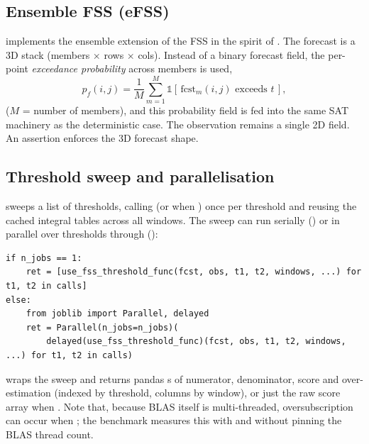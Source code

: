 \subsection{Ensemble FSS (eFSS)}
\label{sec:eps}

 implements the ensemble extension of the FSS in the
spirit of \citet{duc2013}. The forecast is a 3D stack (members $\times$ rows
$\times$ cols). Instead of a binary forecast field, the per-point
\emph{exceedance probability} across members is used,
%
\begin{equation}
  p_f(i,j) = \frac{1}{M}\sum_{m=1}^{M}\mathbb{1}\!\left[\,\text{fcst}_m(i,j)
             \text{ exceeds } t\,\right],
\end{equation}
%
($M$ = number of members), and this probability field is fed into the same SAT
machinery as the deterministic case. The observation remains a single 2D field.
An assertion enforces the 3D forecast shape.

\subsection{Threshold sweep and parallelisation}
\label{sec:parallel}

 sweeps a list of thresholds, calling
 (or  when
) once per threshold and reusing the cached integral tables
across all windows. The sweep can run serially () or in
parallel over thresholds through  ():

{\begin{lstlisting}[style=python]
if n_jobs == 1:
    ret = [use_fss_threshold_func(fcst, obs, t1, t2, windows, ...) for t1, t2 in calls]
else:
    from joblib import Parallel, delayed
    ret = Parallel(n_jobs=n_jobs)(
        delayed(use_fss_threshold_func)(fcst, obs, t1, t2, windows, ...) for t1, t2 in calls)
\end{lstlisting}}

 wraps the sweep and returns pandas
s of numerator, denominator, score and over-estimation
(indexed by threshold, columns by window), or just the raw score array when
. Note that, because BLAS itself is multi-threaded,
oversubscription can occur when ; the benchmark
 measures this with and without pinning the BLAS thread
count.

